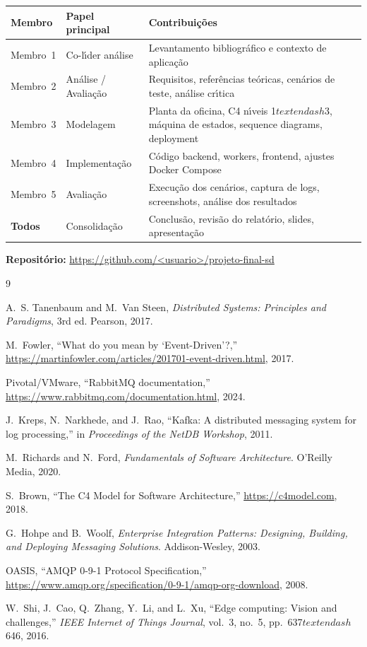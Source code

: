 \documentclass[10pt,a4paper]{article}
\begin{document}
\begin{tabular}{@{}p{3.5cm}p{3cm}p{8cm}@{}}
\toprule
\textbf{Membro} & \textbf{Papel principal} & \textbf{Contribui\c{c}\~oes} \\
\midrule
Membro~1 & Co-l\'\i der an\'alise & Levantamento bibliogr\'afico e contexto de aplica\c{c}\~ao \\
Membro~2 & An\'alise / Avalia\c{c}\~ao & Requisitos, refer\^encias te\'oricas, cen\'arios de teste, an\'alise cr\'\i tica \\
Membro~3 & Modelagem & Planta da oficina, C4 n\'\i veis 1\(textendash\)3, m\'aquina de estados, sequence diagrams, deployment \\
Membro~4 & Implementa\c{c}\~ao & C\'odigo backend, workers, frontend, ajustes Docker Compose \\
Membro~5 & Avalia\c{c}\~ao & Execu\c{c}\~ao dos cen\'arios, captura de logs, screenshots, an\'alise dos resultados \\
\textbf{Todos} & Consolida\c{c}\~ao & Conclus\~ao, revis\~ao do relat\'orio, slides, apresenta\c{c}\~ao \\
\bottomrule
\end{tabular}

\medskip\noindent\textbf{Reposit\'orio:} \url{https://github.com/<usuario>/projeto-final-sd}

\begin{thebibliography}{9}

A.~S. Tanenbaum and M.~Van Steen, \emph{Distributed Systems: Principles and Paradigms}, 3rd ed. Pearson, 2017.

M.~Fowler, ``What do you mean by `Event-Driven'?,'' \url{https://martinfowler.com/articles/201701-event-driven.html}, 2017.

Pivotal/VMware, ``RabbitMQ documentation,'' \url{https://www.rabbitmq.com/documentation.html}, 2024.

J.~Kreps, N.~Narkhede, and J.~Rao, ``Kafka: A distributed messaging system for log processing,'' in \emph{Proceedings of the NetDB Workshop}, 2011.

M.~Richards and N.~Ford, \emph{Fundamentals of Software Architecture}. O'Reilly Media, 2020.

S.~Brown, ``The C4 Model for Software Architecture,'' \url{https://c4model.com}, 2018.

G.~Hohpe and B.~Woolf, \emph{Enterprise Integration Patterns: Designing, Building, and Deploying Messaging Solutions}. Addison-Wesley, 2003.

OASIS, ``AMQP 0-9-1 Protocol Specification,'' \url{https://www.amqp.org/specification/0-9-1/amqp-org-download}, 2008.

W.~Shi, J.~Cao, Q.~Zhang, Y.~Li, and L.~Xu, ``Edge computing: Vision and challenges,'' \emph{IEEE Internet of Things Journal}, vol.~3, no.~5, pp.~637\(textendash\)646, 2016.

\end{thebibliography}
\end{document}
